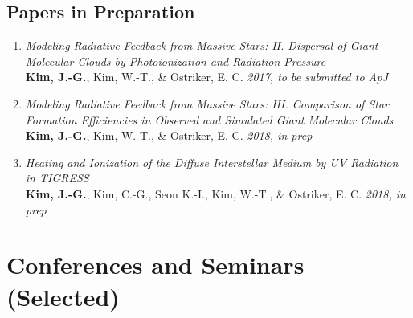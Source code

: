 \documentclass[11pt,letterpaper,roman]{moderncv}        %
\begin{document}
\subsection{Papers in Preparation}
\begin{enumerate}
\item[] \textit{Modeling Radiative Feedback from Massive Stars:
    II. Dispersal of Giant Molecular Clouds by Photoionization and
    Radiation Pressure}\\
  \textbf{Kim, J.-G.}, Kim, W.-T., \& Ostriker, E. C. \textit{2017,
    to be submitted to ApJ}
\item[] \textit{Modeling Radiative Feedback from Massive Stars:
    III. Comparison of Star Formation Efficiencies in Observed and
    Simulated Giant Molecular Clouds}\\
  \textbf{Kim, J.-G.}, Kim, W.-T., \& Ostriker, E. C. \textit{2018, in
    prep}
\item[] \textit{Heating and Ionization of
      the Diffuse Interstellar Medium by UV Radiation in TIGRESS}\\
    \textbf{Kim, J.-G.}, Kim, C.-G., Seon K.-I., Kim, W.-T., \&
    Ostriker, E. C. \textit{2018, in prep}
\end{enumerate}


\section{Conferences and Seminars (Selected)}
\end{document}
